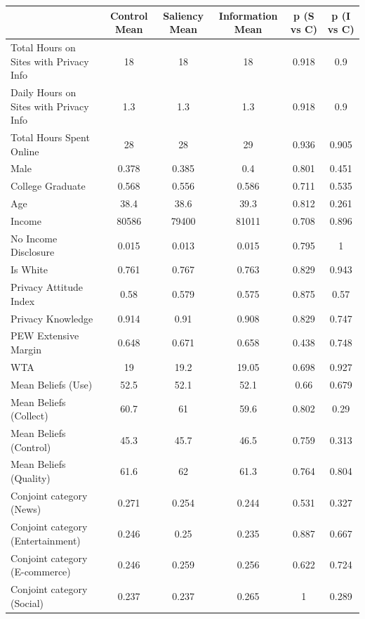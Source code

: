 \begin{tabular}{|l|c|c|c|c|c|}
\hline
 & Control Mean & Saliency Mean & Information Mean & p (S vs C) & p (I vs C) \\
\hline
Total Hours on Sites with Privacy Info & 18 & 18 & 18 & 0.918 & 0.9 \\
\hline
Daily Hours on Sites with Privacy Info & 1.3 & 1.3 & 1.3 & 0.918 & 0.9 \\
\hline
Total Hours Spent Online & 28 & 28 & 29 & 0.936 & 0.905 \\
\hline
Male & 0.378 & 0.385 & 0.4 & 0.801 & 0.451 \\
\hline
College Graduate & 0.568 & 0.556 & 0.586 & 0.711 & 0.535 \\
\hline
Age & 38.4 & 38.6 & 39.3 & 0.812 & 0.261 \\
\hline
Income & 80586 & 79400 & 81011 & 0.708 & 0.896 \\
\hline
No Income Disclosure & 0.015 & 0.013 & 0.015 & 0.795 & 1 \\
\hline
Is White & 0.761 & 0.767 & 0.763 & 0.829 & 0.943 \\
\hline
Privacy Attitude Index & 0.58 & 0.579 & 0.575 & 0.875 & 0.57 \\
\hline
Privacy Knowledge & 0.914 & 0.91 & 0.908 & 0.829 & 0.747 \\
\hline
PEW Extensive Margin & 0.648 & 0.671 & 0.658 & 0.438 & 0.748 \\
\hline
WTA & 19 & 19.2 & 19.05 & 0.698 & 0.927 \\
\hline
Mean Beliefs (Use) & 52.5 & 52.1 & 52.1 & 0.66 & 0.679 \\
\hline
Mean Beliefs (Collect) & 60.7 & 61 & 59.6 & 0.802 & 0.29 \\
\hline
Mean Beliefs (Control) & 45.3 & 45.7 & 46.5 & 0.759 & 0.313 \\
\hline
Mean Beliefs (Quality) & 61.6 & 62 & 61.3 & 0.764 & 0.804 \\
\hline
Conjoint category (News) & 0.271 & 0.254 & 0.244 & 0.531 & 0.327 \\
\hline
Conjoint category (Entertainment) & 0.246 & 0.25 & 0.235 & 0.887 & 0.667 \\
\hline
Conjoint category (E-commerce) & 0.246 & 0.259 & 0.256 & 0.622 & 0.724 \\
\hline
Conjoint category (Social) & 0.237 & 0.237 & 0.265 & 1 & 0.289 \\
\hline
\end{tabular}

